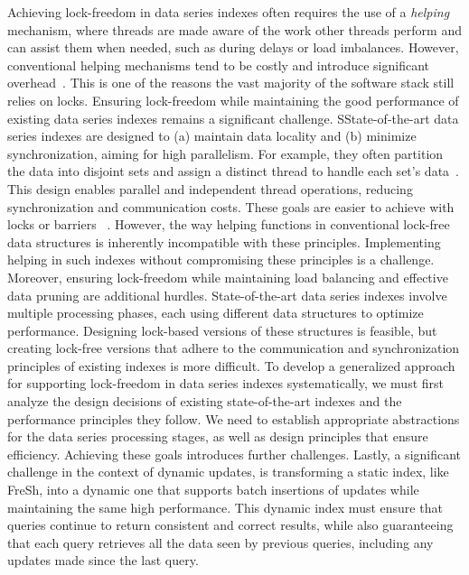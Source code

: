 Achieving lock-freedom in data series indexes often requires the use of a {\em helping} mechanism,
where threads are made aware of the work other threads perform and can assist them when
needed, such as during delays or load imbalances. However, conventional helping mechanisms
tend to be costly and introduce significant overhead~\cite{F04,HS08,7515610,Williams2012CCI}.
This is one of the reasons the vast majority of the software stack still relies on locks.
Ensuring lock-freedom while maintaining the good performance of existing data series indexes 
remains a significant challenge.
%
SState-of-the-art data series indexes are designed to (a) maintain data locality
and (b) minimize synchronization, aiming for high parallelism. 
For example, they often partition the data into disjoint sets and assign a distinct thread to 
handle each set's data~\cite{parisplus,PFP21-I,PFP21-II}.
This design enables parallel and independent thread operations, reducing synchronization
and communication costs. These goals are easier to achieve with locks or barriers
~\cite{peng2018paris,peng2020messi,PFP21-I,PFP21-II}.
%
However, the way helping functions in conventional lock-free data structures is inherently
incompatible with these principles. Implementing helping in such indexes without compromising
these principles is a challenge.
%
Moreover, ensuring lock-freedom while maintaining load balancing and effective data pruning
are additional hurdles. State-of-the-art data series indexes involve multiple processing phases,
each using different data structures to optimize performance. Designing lock-based versions of
these structures is feasible, but creating lock-free versions that adhere to the communication
and synchronization principles of existing indexes is more difficult.
%
To develop a generalized approach for supporting lock-freedom in data series indexes systematically,
we must first analyze the design decisions of existing state-of-the-art indexes and the performance
principles they follow. We need to establish appropriate abstractions for the data series processing
stages, as well as design principles that ensure efficiency. Achieving these goals introduces further
challenges.
%
Lastly, a significant challenge in the context of dynamic updates, is transforming
a static index, like FreSh, into a dynamic one that supports batch insertions of updates while 
maintaining the same high performance. This dynamic index must ensure that queries continue to 
return consistent and correct results, while also guaranteeing that each query retrieves all the 
data seen by previous queries, including any updates made since the last query.


